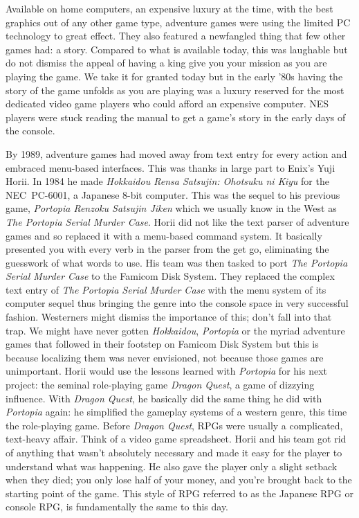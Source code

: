 \documentclass{book}
\begin{document}
Available on home computers, an expensive luxury at the time, with the best graphics out of any other game type, adventure games were using the limited PC technology to great effect. They also featured a newfangled thing that few other games had: a story. Compared to what is available today, this was laughable but do not dismiss the appeal of having a king give you your mission as you are playing the game. We take it for granted today but in the early ’80s having the story of the game unfolds as you are playing was a luxury reserved for the most dedicated video game players who could afford an expensive computer. NES players were stuck reading the manual to get a game’s story in the early days of the console.

By 1989, adventure games had moved away from text entry for every action and embraced menu-based interfaces. This was thanks in large part to Enix’s Yuji Horii. In 1984 he made \emph{Hokkaidou Rensa Satsujin: Ohotsuku ni Kiyu} for the NEC~PC-6001, a Japanese 8-bit computer. This was the sequel to his previous game, \emph{Portopia Renzoku Satsujin Jiken} which we usually know in the West as \emph{The Portopia Serial Murder Case}. Horii did not like the text parser of adventure games and so replaced it with a menu-based command system. It basically presented you with every verb in the parser from the get go, eliminating the guesswork of what words to use. His team was then tasked to port \emph{The Portopia Serial Murder Case} to the Famicom Disk System. They replaced the complex text entry of \emph{The Portopia Serial Murder Case} with the menu system of its computer sequel thus bringing the genre into the console space in very successful fashion. Westerners might dismiss the importance of this; don’t fall into that trap. We might have never gotten \emph{Hokkaidou}, \emph{Portopia} or the myriad adventure games that followed in their footstep on Famicom Disk System but this is because localizing them was never envisioned, not because those games are unimportant. Horii would use the lessons learned with \emph{Portopia} for his next project: the seminal role-playing game \emph{Dragon Quest}, a game of dizzying influence. With \emph{Dragon Quest}, he basically did the same thing he did with \emph{Portopia} again: he simplified the gameplay systems of a western genre, this time the role-playing game. Before \emph{Dragon Quest}, RPGs were usually a complicated, text-heavy affair. Think of a video game spreadsheet. Horii and his team got rid of anything that wasn’t absolutely necessary and made it easy for the player to understand what was happening. He also gave the player only a slight setback when they died; you only lose half of your money, and you’re brought back to the starting point of the game. This style of RPG referred to as the Japanese RPG or console RPG, is fundamentally the same to this day.
\end{document}
